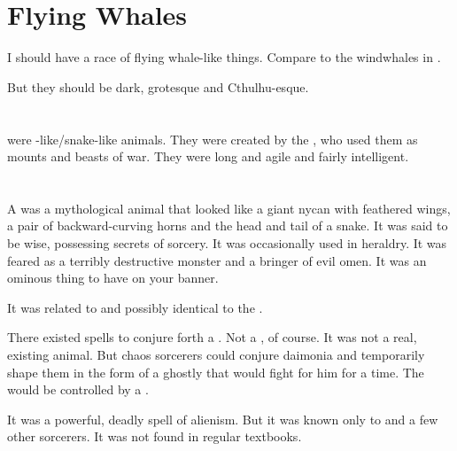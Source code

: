 \section{Flying Whales}
I should have a race of flying whale-like things. 
Compare to the windwhales in \cite{GlenCook:TheWhiteRose}. 

But they should be dark, grotesque and Cthulhu-esque. 














\section{\Lindworm}
\index{\lindworm}
\Lindworms were \dragon-like/snake-like animals. 
They were created by the \ophidians, who used them as mounts and beasts of war. 
They were long and agile and fairly intelligent. 














\section{\Malgryph}
\index{\malgryph}
A \malgryph was a mythological animal that looked like a giant nycan with feathered wings, a pair of backward-curving horns and the head and tail of a snake.
It was said to be wise, possessing secrets of sorcery.
It was occasionally used in heraldry. 
It was feared as a terribly destructive monster and a bringer of evil omen.
It was an ominous thing to have on your banner.

It was related to and possibly identical to the . 

There existed spells to conjure forth a \malgryph.
Not a  \malgryph, of course. 
It was not a real, existing animal.
But chaos sorcerers could conjure daimonia and temporarily shape them in the form of a ghostly \malgryph that would fight for him for a time.
The \malgryph would be controlled by a \homunculus. 

It was a powerful, deadly spell of alienism.
But it was known only to \dragons and a few other sorcerers.
It was not found in regular \rethyactic textbooks.

